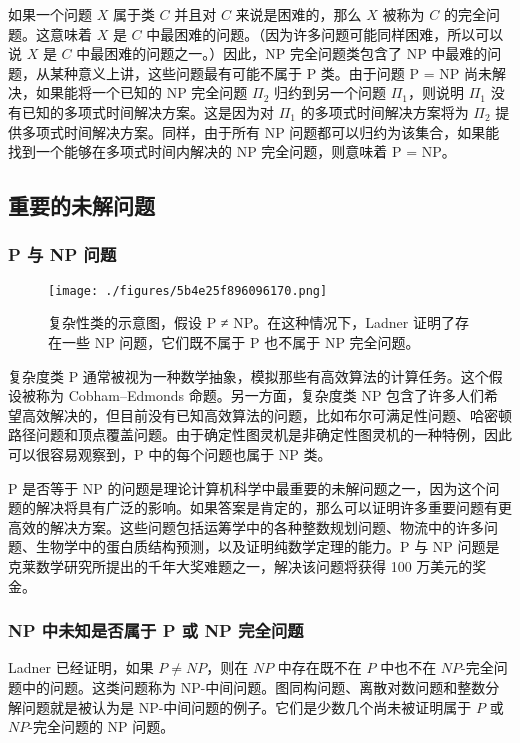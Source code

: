 如果一个问题 \( X \) 属于类 \( C \) 并且对 \( C \) 来说是困难的，那么 \( X \) 被称为 \( C \) 的完全问题。这意味着 \( X \) 是 \( C \) 中最困难的问题。（因为许多问题可能同样困难，所以可以说 \( X \) 是 \( C \) 中最困难的问题之一。）因此，NP 完全问题类包含了 NP 中最难的问题，从某种意义上讲，这些问题最有可能不属于 P 类。由于问题 P = NP 尚未解决，如果能将一个已知的 NP 完全问题 \( \Pi_2 \) 归约到另一个问题 \( \Pi_1 \)，则说明 \( \Pi_1 \) 没有已知的多项式时间解决方案。这是因为对 \( \Pi_1 \) 的多项式时间解决方案将为 \( \Pi_2 \) 提供多项式时间解决方案。同样，由于所有 NP 问题都可以归约为该集合，如果能找到一个能够在多项式时间内解决的 NP 完全问题，则意味着 P = NP。
\subsection{重要的未解问题}
\subsubsection{P 与 NP 问题}  
\begin{figure}[ht]
\centering
\texttt{[image: ./figures/5b4e25f896096170.png]}
\caption{复杂性类的示意图，假设 P ≠ NP。在这种情况下，Ladner 证明了存在一些 NP 问题，它们既不属于 P 也不属于 NP 完全问题。} \label{fig_JSFZ_6}
\end{figure}  
复杂度类 P 通常被视为一种数学抽象，模拟那些有高效算法的计算任务。这个假设被称为 Cobham–Edmonds 命题。另一方面，复杂度类 NP 包含了许多人们希望高效解决的，但目前没有已知高效算法的问题，比如布尔可满足性问题、哈密顿路径问题和顶点覆盖问题。由于确定性图灵机是非确定性图灵机的一种特例，因此可以很容易观察到，P 中的每个问题也属于 NP 类。

P 是否等于 NP 的问题是理论计算机科学中最重要的未解问题之一，因为这个问题的解决将具有广泛的影响。如果答案是肯定的，那么可以证明许多重要问题有更高效的解决方案。这些问题包括运筹学中的各种整数规划问题、物流中的许多问题、生物学中的蛋白质结构预测，以及证明纯数学定理的能力。P 与 NP 问题是克莱数学研究所提出的千年大奖难题之一，解决该问题将获得 100 万美元的奖金。
\subsubsection{NP 中未知是否属于 P 或 NP 完全问题} 
Ladner 已经证明，如果 \( P \neq NP \)，则在 \( NP \) 中存在既不在 \( P \) 中也不在 \( NP \)-完全问题中的问题。这类问题称为 NP-中间问题。图同构问题、离散对数问题和整数分解问题就是被认为是 NP-中间问题的例子。它们是少数几个尚未被证明属于 \( P \) 或 \( NP \)-完全问题的 NP 问题。

